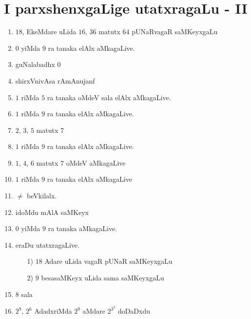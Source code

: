 \chapter{I parxshenxgaLige utatxragaLu - {\rm II}}

\begin{enumerate}
  \renewcommand{\labelenumi}{\rm(\theenumi)}
  \itemsep=1pt
\item $18$, EkeMdare uLida $16$, $36$ matutx $64$ pUNaRvagaR saMKeyxgaLu 

\item $0$ yiMda $9$ ra tanaka elAlx aMkagaLive.

\item guNalabadhx $0$

\item shirxVnivAsa rAmAnujanf

\item $1$ riMda $5$ ra tanaka oMdeV sala elAlx aMkagaLive.

\item $1$ riMda $9$ ra tanaka elAlx aMkagaLive.

\item $2$, $3$, $5$ matutx $7$

\item $1$ riMda $9$ ra tanaka elAlx aMkagaLive.

\item $1$, $4$, $6$ matutx $7$ oMdeV aMkagaLive

\item $1$ riMda $9$ ra tanaka elAlx aMkagaLive

\item $\neq$ beVkilalx.

 \item idoMdu mAlA saMKeyx

\item $0$ yiMda $9$ ra tanaka aMkagaLive.

  \newpage
  
\item eraDu utatxragaLive.
  \begin{itemize}
  \item[{\rm 1)}] $18$ Adare uLida vagaR pUNaR saMKeyxgaLu

  \item[{\rm 2)}] $9$ besasaMKeyx uLida sama saMKeyxgaLu
      \end{itemize}

\item $8$ sala 

  
\item $2^9$, $2^6$ AdadxriMda $2^9$ aMdare $2^{3^2}$ doDaDxdu


\end{enumerate}
